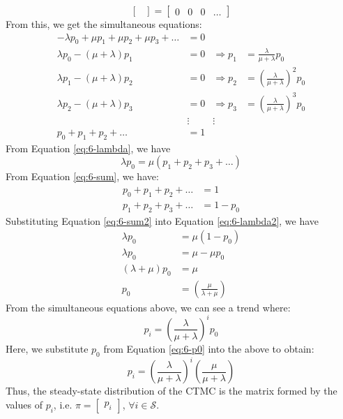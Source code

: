 \documentclass[12pt]{article}
\begin{document}
\begin{equation*}
\begin{bmatrix}
    \end{bmatrix} = \begin{bmatrix}
        0 & 0 & 0 & \dots
    \end{bmatrix}
\end{equation*} From this, we get the simultaneous equations: \begin{align}\label{eq:6-lambda}
    -\lambda p_{0} + \mu p_{1} + \mu p_{2} + \mu p_{3} + \dots &= 0 & \\ \nonumber
    \lambda p_{0} - (\mu + \lambda)p_{1} &= 0 & \Longrightarrow p_{1} &= \frac{\lambda}{\mu+\lambda}p_{0} \\ \nonumber
    \lambda p_{1} - (\mu + \lambda)p_{2} &= 0 & \Longrightarrow p_{2} &= \left( \frac{\lambda}{\mu+\lambda} \right)^2p_{0}\\ \nonumber
    \lambda p_{2} - (\mu + \lambda)p_{3} &= 0 & \Longrightarrow p_{3} &= \left( \frac{\lambda}{\mu+\lambda}\right)^{3} p_{0}\\ \nonumber
    &\vdots &\vdots \\ \label{eq:6-sum}
    p_{0} + p_{1} + p_{2} + \dots &= 1
\end{align} From Equation \ref{eq:6-lambda}, we have \begin{equation}\label{eq:6-lambda2}
    \lambda p_{0} = \mu\left( p_{1} + p_{2} + p_{3} + \dots \right) 
\end{equation} From Equation \ref{eq:6-sum}, we have: \begin{align}\nonumber
    p_{0} + p_{1} + p_{2} + \dots &= 1 \\ \label{eq:6-sum2}
    p_{1} + p_{2} + p_{3} + \dots &= 1 - p_{0}
\end{align} Substituting Equation \ref{eq:6-sum2} into Equation \ref{eq:6-lambda2}, we have \begin{align}\nonumber
    \lambda p_{0} &= \mu(1-p_{0})\\ \nonumber
    \lambda p_{0} &= \mu - \mu p_{0} \\ \nonumber
    (\lambda + \mu)p_{0} &= \mu \\ \label{eq:6-p0}
    p_{0} &= \left( \frac{\mu}{\lambda+\mu} \right)
\end{align} From the simultaneous equations above, we can see a trend where: \begin{equation}
    p_i = \left( \frac{\lambda}{\mu + \lambda} \right)^{i} p_{0}
\end{equation} Here, we substitute $p_{0}$ from Equation \ref{eq:6-p0} into the above to obtain: \begin{equation}
    p_i = \left( \frac{\lambda}{\mu+\lambda} \right)^{i}\left( \frac{\mu}{\mu+\lambda} \right)
\end{equation} Thus, the steady-state distribution of the CTMC is the matrix formed by the values of $p_i$, i.e. $\pi = \begin{bmatrix}
    p_i
\end{bmatrix}$, $\forall i \in \mathcal{S}$.
\end{document}
